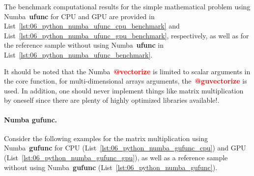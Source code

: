 


\par
The benchmark computational results for the simple mathematical problem using Numba~\textbf{ufunc} for CPU and GPU are provided in List~\ref{lst:06_python_numba_ufunc_cpu_benchmark} and List~\ref{lst:06_python_numba_ufunc_gpu_benchmark}, respectively, as well as for the reference sample without using Numba~\textbf{ufunc} in List~\ref{lst:06_python_numba_ufunc_benchmark}.











\par
It should be noted that the Numba~\textbf{\textcolor{red}{@vectorize}} is limited to scalar arguments in the core function, for multi-dimensional arrays arguments, the~\textbf{\textcolor{red}{@guvectorize}} is used.
In addition, one should never implement things like matrix multiplication by oneself since there are plenty of highly optimized libraries available!.


\paragraph{Numba gufunc.}
Consider the following examples for the matrix multiplication using Numba~\textbf{gufunc} for CPU (List~\ref{lst:06_python_numba_gufunc_cpu}) and GPU (List~\ref{lst:06_python_numba_gufunc_gpu}), as well as a reference sample without using Numba~\textbf{gufunc} (List~\ref{lst:06_python_numba_gufunc}).


